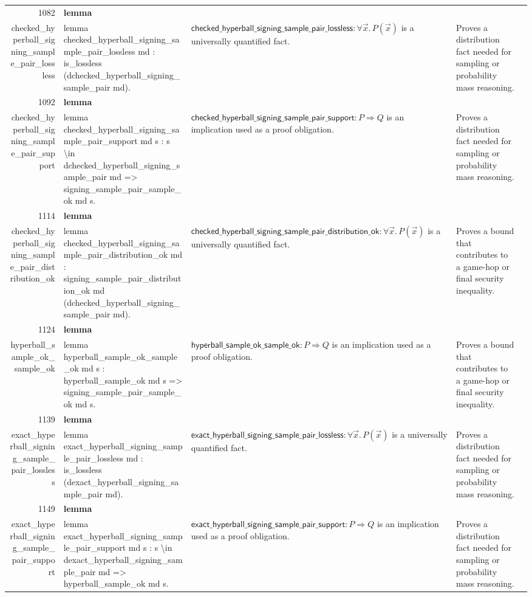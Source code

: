\documentclass[10pt]{article}
\newcommand{\ec}[1]{\begingroup\ttfamily\scriptsize #1\endgroup}
\begin{document}
\begin{longtable}{r L{0.17\textwidth} L{0.26\textwidth} L{0.27\textwidth} L{0.20\textwidth}}
1082 & \textbf{lemma}\\\ec{checked\_hyperball\_signing\_sample\_pair\_lossless} & \ec{lemma checked\_hyperball\_signing\_sample\_pair\_lossless md : is\_lossless (dchecked\_hyperball\_signing\_sample\_pair md).} & \(\mathsf{checked\_hyperball\_signing\_sample\_pair\_lossless} : \forall \vec{x}.\, P(\vec{x})\) is a universally quantified fact. & Proves a distribution fact needed for sampling or probability mass reasoning. \\
1092 & \textbf{lemma}\\\ec{checked\_hyperball\_signing\_sample\_pair\_support} & \ec{lemma checked\_hyperball\_signing\_sample\_pair\_support md s : s \textbackslash{}in dchecked\_hyperball\_signing\_sample\_pair md => signing\_sample\_pair\_sample\_ok md s.} & \(\mathsf{checked\_hyperball\_signing\_sample\_pair\_support} : P \Rightarrow Q\) is an implication used as a proof obligation. & Proves a distribution fact needed for sampling or probability mass reasoning. \\
1114 & \textbf{lemma}\\\ec{checked\_hyperball\_signing\_sample\_pair\_distribution\_ok} & \ec{lemma checked\_hyperball\_signing\_sample\_pair\_distribution\_ok md : signing\_sample\_pair\_distribution\_ok md (dchecked\_hyperball\_signing\_sample\_pair md).} & \(\mathsf{checked\_hyperball\_signing\_sample\_pair\_distribution\_ok} : \forall \vec{x}.\, P(\vec{x})\) is a universally quantified fact. & Proves a bound that contributes to a game-hop or final security inequality. \\
1124 & \textbf{lemma}\\\ec{hyperball\_sample\_ok\_sample\_ok} & \ec{lemma hyperball\_sample\_ok\_sample\_ok md s : hyperball\_sample\_ok md s => signing\_sample\_pair\_sample\_ok md s.} & \(\mathsf{hyperball\_sample\_ok\_sample\_ok} : P \Rightarrow Q\) is an implication used as a proof obligation. & Proves a bound that contributes to a game-hop or final security inequality. \\
1139 & \textbf{lemma}\\\ec{exact\_hyperball\_signing\_sample\_pair\_lossless} & \ec{lemma exact\_hyperball\_signing\_sample\_pair\_lossless md : is\_lossless (dexact\_hyperball\_signing\_sample\_pair md).} & \(\mathsf{exact\_hyperball\_signing\_sample\_pair\_lossless} : \forall \vec{x}.\, P(\vec{x})\) is a universally quantified fact. & Proves a distribution fact needed for sampling or probability mass reasoning. \\
1149 & \textbf{lemma}\\\ec{exact\_hyperball\_signing\_sample\_pair\_support} & \ec{lemma exact\_hyperball\_signing\_sample\_pair\_support md s : s \textbackslash{}in dexact\_hyperball\_signing\_sample\_pair md => hyperball\_sample\_ok md s.} & \(\mathsf{exact\_hyperball\_signing\_sample\_pair\_support} : P \Rightarrow Q\) is an implication used as a proof obligation. & Proves a distribution fact needed for sampling or probability mass reasoning. \\

\end{longtable}
\end{document}
